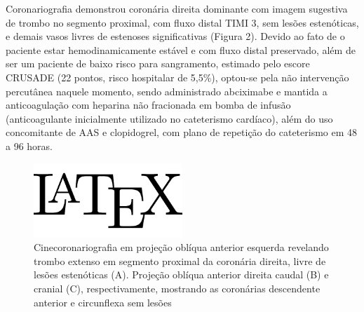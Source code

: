 \par Coronariografia demonstrou coronária direita dominante com imagem sugestiva de trombo no segmento proximal, com fluxo distal TIMI 3, sem lesões estenóticas, e demais vasos livres de estenoses significativas (Figura 2). Devido ao fato de o paciente estar hemodinamicamente estável e com fluxo distal preservado, além de ser um paciente de baixo risco para sangramento, estimado pelo escore CRUSADE (22 pontos, risco hospitalar de 5,5\%), optou-se pela não intervenção percutânea naquele momento, sendo administrado abciximabe e mantida a anticoagulação com heparina não fracionada em bomba de infusão (anticoagulante inicialmente utilizado no cateterismo cardíaco), além do uso concomitante de AAS e clopidogrel, com plano de repetição do cateterismo em 48 a 96 horas.

\par
\begin{figure}[p]
	\centering
	\includegraphics[width=0.5\textwidth]{temp.png}
	\caption{Cinecoronariografia em projeção oblíqua anterior esquerda revelando trombo extenso em segmento proximal da coronária direita, livre de lesões estenóticas (A). Projeção oblíqua anterior direita caudal (B) e cranial (C), respectivamente, mostrando as coronárias descendente anterior e circunflexa sem lesões}
	\label{Figura 2}
\end{figure}

